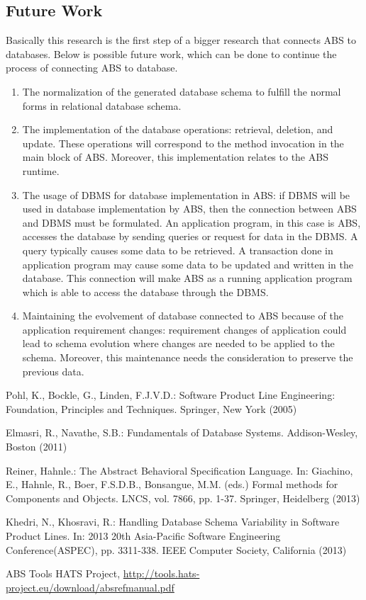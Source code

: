 \documentclass[runningheads,a4paper]{llncs}
\begin{document}
\subsection{Future Work}
Basically this research is the first step of a bigger research that connects ABS to databases. Below is possible future work, which can be done to continue the process of connecting ABS to database.

\begin{enumerate}
	\item The normalization of the generated database schema to fulfill the normal forms in relational database schema.
	\item The implementation of the database operations: retrieval, deletion, and update. These operations will correspond to the method invocation in the main block of ABS. Moreover, this implementation relates to the ABS runtime.
	\item The usage of DBMS for database implementation in ABS: if DBMS will be used in database implementation by ABS, then the connection between ABS and DBMS must be formulated. An application program, in this case is ABS, accesses the database by sending queries or request for data in the DBMS. A query typically causes some data to be retrieved. A transaction done in application program may cause some data to be updated and written in the database. This connection will make ABS as a running application program which is able to access the database through the DBMS.
	\item Maintaining the evolvement of database connected to ABS because of the application requirement changes: requirement changes of application could lead to schema evolution where changes are needed to be applied to the schema. Moreover, this maintenance needs the consideration to preserve the previous data.
\end{enumerate}

\begin{thebibliography}{4}
	
	 Pohl, K., Bockle, G., Linden, F.J.V.D.: Software Product Line Engineering: Foundation, Principles and Techniques. Springer, New York (2005)
	
	 Elmasri, R., Navathe, S.B.: Fundamentals of Database Systems. Addison-Wesley, Boston (2011)
	
	 Reiner, Hahnle.: The Abstract Behavioral Specification Language. In: Giachino, E., Hahnle, R., Boer, F.S.D.B., Bonsangue, M.M. (eds.) Formal methods for Components and Objects. LNCS, vol. 7866, pp. 1-37. Springer, Heidelberg (2013)
	
	 Khedri, N., Khosravi, R.: Handling Database Schema Variability in Software Product Lines. In: 2013 20th Asia-Pacific Software Engineering Conference(ASPEC), pp.
	3311-338. IEEE Computer Society, California (2013)
	
	 ABS Tools HATS Project, \url{http://tools.hats-project.eu/download/absrefmanual.pdf}
	
\end{thebibliography}

\newpage
\tableofcontents

\newpage
\begin{appendix}
	\listoffigures
	\listoftables
\end{appendix}
\end{document}
